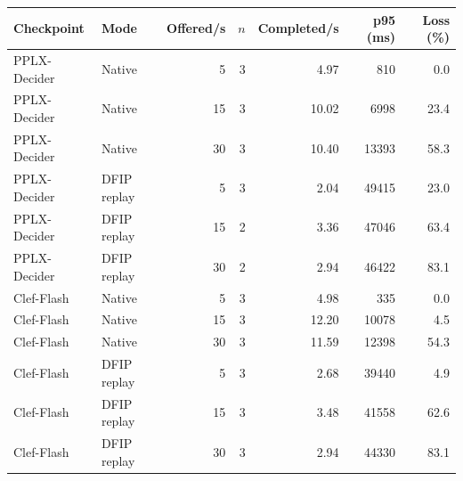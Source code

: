 \begin{tabular}{llrrrrr}
\toprule
Checkpoint & Mode & Offered/s & $n$ & Completed/s & p95 (ms) & Loss (\%) \\
\midrule
PPLX-Decider & Native & 5 & 3 & 4.97 & 810 & 0.0 \\
PPLX-Decider & Native & 15 & 3 & 10.02 & 6998 & 23.4 \\
PPLX-Decider & Native & 30 & 3 & 10.40 & 13393 & 58.3 \\
PPLX-Decider & DFIP replay & 5 & 3 & 2.04 & 49415 & 23.0 \\
PPLX-Decider & DFIP replay & 15 & 2 & 3.36 & 47046 & 63.4 \\
PPLX-Decider & DFIP replay & 30 & 2 & 2.94 & 46422 & 83.1 \\
Clef-Flash & Native & 5 & 3 & 4.98 & 335 & 0.0 \\
Clef-Flash & Native & 15 & 3 & 12.20 & 10078 & 4.5 \\
Clef-Flash & Native & 30 & 3 & 11.59 & 12398 & 54.3 \\
Clef-Flash & DFIP replay & 5 & 3 & 2.68 & 39440 & 4.9 \\
Clef-Flash & DFIP replay & 15 & 3 & 3.48 & 41558 & 62.6 \\
Clef-Flash & DFIP replay & 30 & 3 & 2.94 & 44330 & 83.1 \\
\bottomrule
\end{tabular}
